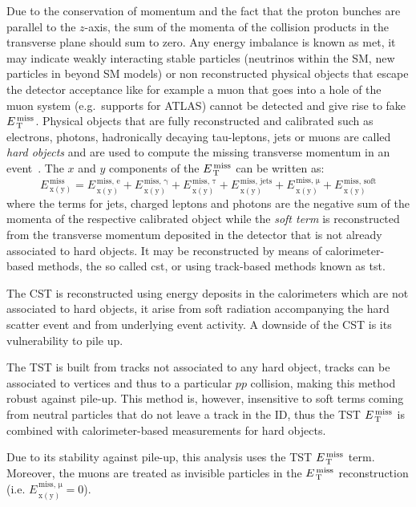Due to the conservation of momentum and the fact that the proton bunches are
parallel to the $z$-axis, the sum of the momenta of the collision products in
the transverse plane should sum to zero. Any energy imbalance is known as
\gls{met}, it may indicate weakly interacting stable particles (neutrinos within
the SM, new particles in beyond SM models) or non reconstructed physical objects
that escape the detector acceptance like for example a muon that goes into a
hole of the muon system (e.g.\ supports for ATLAS) cannot be detected and give
rise to fake $E_\mathrm{\, T}^\mathrm{\, miss}$.  Physical objects that are fully reconstructed and
calibrated such as electrons, photons, hadronically decaying tau-leptons, jets
or muons are called \emph{hard objects} and are used to compute the missing
transverse momentum in an event~\cite{MET}. The $x$ and $y$ components of the
$E_\mathrm{\, T}^\mathrm{\, miss}$ can be written as:
\begin{equation}
  \label{eq:94}
  E_\mathrm{\, x(y)}^\mathrm{\, miss} = E_\mathrm{\, x(y)}^\mathrm{\, miss,\, e} +
  E_\mathrm{\, x(y)}^\mathrm{\, miss,\, \gamma} + E_\mathrm{\, x(y)}^\mathrm{\,
    miss,\, \tau} + E_\mathrm{\, x(y)}^\mathrm{\, miss,\, \text{jets}} +
  E_\mathrm{\, x(y)}^\mathrm{\, miss,\, \mu} + E_\mathrm{\, x(y)}^\mathrm{\, miss,\,
    \text{soft}}
\end{equation}
where the terms for jets, charged leptons and photons are the negative sum of
the momenta of the respective calibrated object while the \emph{soft term} is
reconstructed from the transverse momentum deposited in the detector that is not
already associated to hard objects. It may be reconstructed by means of
calorimeter-based methods, the so called \gls{cst}, or using track-based methods
known as \gls{tst}.

The CST is reconstructed using energy deposits in the calorimeters which are not
associated to hard objects, it arise from soft radiation accompanying the hard
scatter event and from underlying event activity. A downside of the CST is its
vulnerability to pile up.

The TST is built from tracks not associated to any hard object, tracks can be
associated to vertices and thus to a particular $pp$ collision, making this
method robust against pile-up. This method is, however, insensitive to soft
terms coming from neutral particles that do not leave a track in the ID, thus
the TST $E_\mathrm{\, T}^\mathrm{\, miss}$ is combined with calorimeter-based measurements for hard objects.

Due to its stability against pile-up, this analysis uses the TST $E_\mathrm{\, T}^\mathrm{\, miss}$ term.
Moreover, the muons are treated as invisible particles in the $E_\mathrm{\, T}^\mathrm{\, miss}$
reconstruction (i.e. $E_\mathrm{\, x(y)}^\mathrm{\, miss,\, \mu} = 0$).
